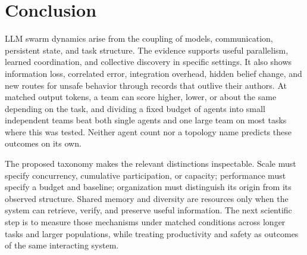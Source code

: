 \section{Conclusion}
LLM swarm dynamics arise from the coupling of models, communication, persistent state, and task structure. The evidence supports useful parallelism, learned coordination, and collective discovery in specific settings. It also shows information loss, correlated error, integration overhead, hidden belief change, and new routes for unsafe behavior through records that outlive their authors. At matched output tokens, a team can score higher, lower, or about the same depending on the task, and dividing a fixed budget of agents into small independent teams beat both single agents and one large team on most tasks where this was tested. Neither agent count nor a topology name predicts these outcomes on its own.

The proposed taxonomy makes the relevant distinctions inspectable. Scale must specify concurrency, cumulative participation, or capacity; performance must specify a budget and baseline; organization must distinguish its origin from its observed structure. Shared memory and diversity are resources only when the system can retrieve, verify, and preserve useful information. The next scientific step is to measure those mechanisms under matched conditions across longer tasks and larger populations, while treating productivity and safety as outcomes of the same interacting system.
